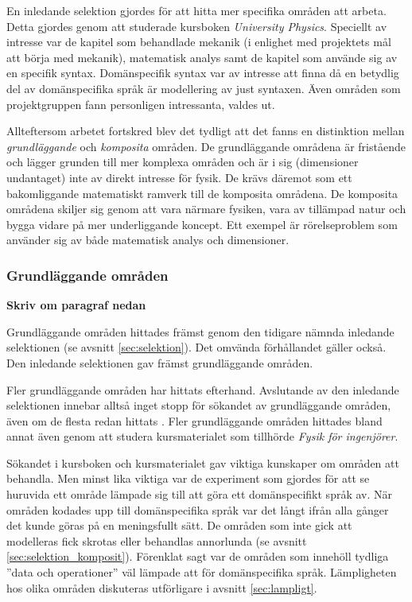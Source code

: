 \begin{binge}
En inledande selektion gjordes för att hitta mer specifika områden att arbeta.
Detta gjordes genom att studerade kursboken \textit{University Physics}.
Speciellt av intresse var de kapitel som behandlade mekanik (i enlighet med
projektets mål att börja med mekanik), matematisk analys samt de kapitel som
använde sig av en specifik syntax. Domänspecifik syntax var av intresse att
finna då en betydlig del av domänspecifika språk är modellering av just
syntaxen. Även områden som projektgruppen fann personligen intressanta, 
valdes ut.

Allteftersom arbetet fortskred blev det tydligt att det fanns en distinktion
mellan \textit{grundläggande} och \textit{komposita} områden. De grundläggande
områdena är fristående och lägger grunden till mer komplexa områden och är i sig
(dimensioner undantaget) inte av direkt intresse för fysik. De krävs däremot
som ett bakomliggande matematiskt ramverk till de komposita områdena. 
De komposita områdena skiljer sig genom att vara närmare fysiken, vara av
tillämpad natur och bygga vidare på mer underliggande koncept. Ett exempel är
rörelseproblem som använder sig av både matematisk analys och dimensioner.

\subsubsection{Grundläggande områden}

\textbf{Skriv om paragraf nedan}

Grundläggande områden hittades främst genom den tidigare nämnda inledande
selektionen (se avsnitt \ref{sec:selektion}). Det omvända förhållandet gäller
också. Den inledande selektionen gav främst grundläggande områden. 

Fler grundläggande områden har hittats efterhand. Avslutande av den inledande
selektionen innebar alltså inget stopp för sökandet av grundläggande områden,
även om de flesta redan hittats . Fler grundläggande områden hittades bland
annat även genom att studera kursmaterialet som tillhörde \textit{Fysik för
ingenjörer}.

Sökandet i kursboken och kursmaterialet gav viktiga kunskaper om områden att
behandla. Men minst lika viktiga var de experiment som gjordes för att se
huruvida ett område lämpade sig till att göra ett domänspecifikt språk av. När
områden kodades upp till domänspecifika språk var det långt ifrån alla gånger
det kunde göras på en meningsfullt sätt. De områden som inte gick att
modelleras fick skrotas eller behandlas annorlunda (se avsnitt
\ref{sec:selektion_komposit}). Förenklat sagt var de områden som innehöll
tydliga ''data och operationer'' väl lämpade att för domänspecifika språk.
Lämpligheten hos olika områden diskuteras utförligare i avsnitt
\ref{sec:lampligt}.


\end{binge}

